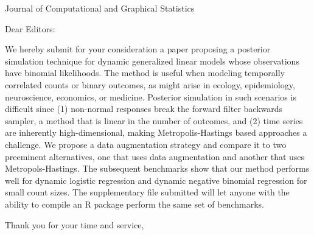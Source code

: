 \documentclass[12pt]{letter}
\newcounter{parnum}
\newcommand{\npoint}{%
  \noindent\refstepcounter{parnum}%
  \makebox[0.5in][c]{\textbf{\arabic{parnum}.}} %
  \marginnote{\small\ttfamily\the\inputlineno}}
\renewcommand{\npoint}{}
\begin{document}
 
\begin{letter}{Journal of Computational and Graphical Statistics}
\opening{Dear Editors:}
 
\npoint We hereby submit for your consideration a paper proposing a posterior
simulation technique for dynamic generalized linear models whose observations
have binomial likelihoods.
%
\npoint The method is useful when modeling temporally correlated counts or
binary outcomes, as might arise in ecology, epidemiology, neuroscience,
economics, or medicine.
% 
\npoint Posterior simulation in such scenarios is difficult since (1) non-normal
responses break the forward filter backwards sampler, a method that is linear in
the number of outcomes, and (2) time series are inherently high-dimensional,
making Metropolis-Hastings based approaches a challenge.
% 
\npoint We propose a data augmentation strategy and compare it to two preeminent
alternatives, one that uses data augmentation and another that uses
Metropols-Hastings.
%
\npoint The subsequent benchmarks show that our method performs well for dynamic
logistic regression and dynamic negative binomial regression for small count
sizes.
% 
\npoint The supplementary file submitted will let anyone with the ability to
compile an R package perform the same set of benchmarks.

\closing{Thank you for your time and service,}
 
 
\end{letter}
 
\end{document}

